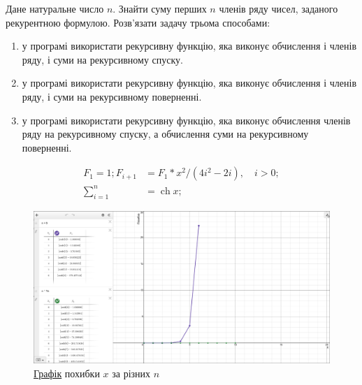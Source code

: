 
\def\basedir{/home/theammir/labs/asd/7/res}


\usepackage{amsmath}
\renewcommand{\cosh}{\operatorname{ch}}
\usepackage[hypcap=false]{caption}
\usepackage{graphicx}
\usepackage[colorlinks=true]{hyperref}



\taskdesc%
Дане натуральне число $n$. Знайти суму перших $n$ членів ряду чисел, заданого рекурентною формулою. Розв'язати задачу трьома способами:
\begin{enumerate}
  \item у програмі використати рекурсивну функцію, яка виконує обчислення і членів ряду, і суми на рекурсивному спуску.
  \item у програмі використати рекурсивну функцію, яка виконує обчислення і членів ряду, і суми на рекурсивному поверненні.
  \item у програмі використати рекурсивну функцію, яка виконує обчислення членів ряду на рекурсивному спуску, а обчислення суми на рекурсивному поверненні.
\end{enumerate}

\taskspec%
\[
\begin{aligned}
  F_1 = 1; F_{i+1} &= F_1 * x^2 \slash \left(4i^2 - 2i\right), \quad i > 0; \\
  \sum_{i=1}^n &= \cosh{x};
\end{aligned}
\]


\tasktest%
\begin{figure}[h!]
  \includegraphics[width=\linewidth]{graph.png}
  \caption{\href{https://www.desmos.com/calculator/ld3qddyify}{Графік} похибки $x$ за різних $n$}
\end{figure}

